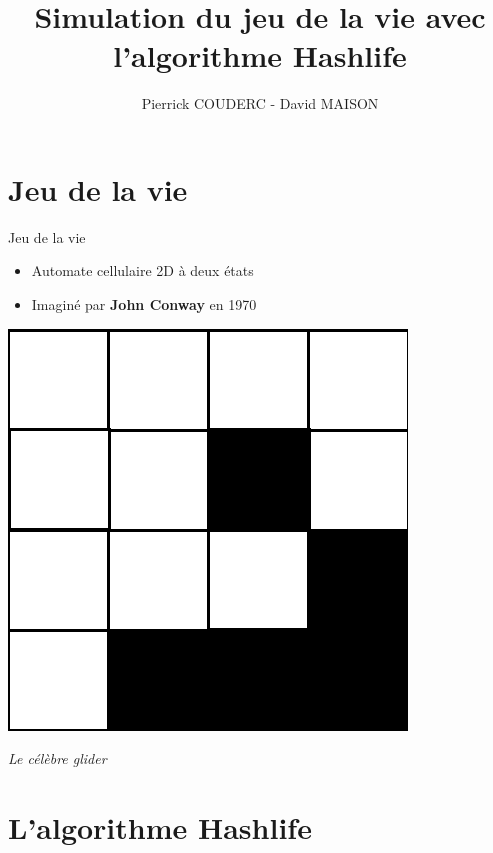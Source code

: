 \documentclass{beamer}
\title[L'algorithme Hashlife]{Simulation du jeu de la vie avec l'algorithme Hashlife}
\author[P. COUDERC - D. MAISON]{Pierrick COUDERC - David MAISON}
\institute[u-psud]{Université Paris-Sud}
\begin{document}
 
\begin{frame}
\titlepage
\end{frame}



\section{Jeu de la vie}

\begin{frame}{Jeu de la vie}
  \begin{itemize}
  \item Automate cellulaire 2D à deux états
  \item Imaginé par \textbf{John Conway} en 1970
  \end{itemize}

  \medskip

  \begin{center}
    \includegraphics[scale=0.2]{glider.png}

    \textit{Le célèbre glider}
  \end{center}
\end{frame}

\section{L'algorithme Hashlife}
\end{document}
